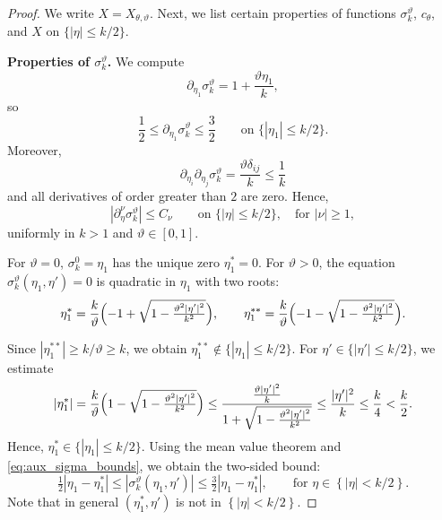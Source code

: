 \documentclass[12pt,a4paper]{amsart}
\numberwithin{equation}{section}
\theoremstyle{plain}
\theoremstyle{definition}
\begin{document}
\begin{proof}
We write $X=X_{\theta,\vartheta}$. Next, we list certain properties of functions $\sigma_k^\vartheta$, $c_\theta$, and $X$ on $\{|\eta|\leq k/2\}$.


\textbf{Properties of $\sigma_k^\vartheta$.}
We compute
\begin{equation*}
    \partial_{\eta_1}\sigma_k^\vartheta = 1+ \frac{\vartheta\eta_1}{k},
\end{equation*}
so
\begin{equation}\label{eq:aux_sigma_bounds}
  \frac{1}{2}\leq \partial_{\eta_1}\sigma_k^\vartheta\le\frac{3}{2}
  \qquad
  \text{on }\{|\eta_1|\leq k/2\}.
\end{equation}
Moreover,
\begin{equation*}
    \partial_{\eta_i}\partial_{\eta_j}\sigma_k^\vartheta = \frac{\vartheta\delta_{ij}}{k} \leq \frac{1}{k}
\end{equation*}
and all derivatives of order greater than $2$ are zero. Hence,
\begin{equation}\label{eq:aux_sigma_allderivs}
  |\partial_\eta^\nu\sigma_k^\vartheta|\leq C_\nu
  \qquad\text{on }\{|\eta|\leq k/2\},\quad\text{for }|\nu|\geq 1,
\end{equation}
uniformly in $k> 1$ and $\vartheta\in[0,1]$.

For $\vartheta=0$, $\sigma_k^0=\eta_1$ has the unique zero $\eta_1^*=0$.
For $\vartheta>0$, the equation $\sigma_k^\vartheta(\eta_1,\eta')=0$
is quadratic in $\eta_1$ with two roots:
\begin{equation*}
    \eta_1^*=\frac{k}{\vartheta}\Bigl(-1+\sqrt{1-\tfrac{\vartheta^2|\eta'|^2}{k^2}}\Bigr),
  \qquad
  \eta_1^{**}=\frac{k}{\vartheta}\Bigl(-1-\sqrt{1-\tfrac{\vartheta^2|\eta'|^2}{k^2}}\Bigr).
\end{equation*}

Since $|\eta_1^{**}|\geq k/\vartheta\geq k$, we obtain $\eta_1^{**} \notin \{|\eta_1|\leq k/2\}$. For $\eta' \in \{|\eta'|\leq k/2\}$, we estimate
\begin{equation}\label{eq:aux_eta1star}
    |\eta_1^*|=\frac{k}{\vartheta}\Bigl(1-\sqrt{1-\tfrac{\vartheta^2|\eta'|^2}{k^2}}\Bigr) \leq \frac{\frac{\vartheta|\eta'|^2}{k}}{1+\sqrt{1-\tfrac{\vartheta^2|\eta'|^2}{k^2}}} \leq \frac{|\eta'|^2}{k} \leq \frac{k}{4} < \frac{k}{2}.
\end{equation}
Hence, $\eta_1^* \in \{|\eta_1|\leq k/2\}$. Using the mean value theorem and \eqref{eq:aux_sigma_bounds}, we obtain the two-sided bound:
\begin{equation}\label{eq:aux_sigma_two_sided}
  \tfrac{1}{2}|\eta_1-\eta_1^*|
  \le|\sigma_k^\vartheta(\eta_1,\eta')|
  \le\tfrac{3}{2}|\eta_1-\eta_1^*|,
  \qquad
  \text{for } \eta \in \left\{|\eta|<k/2\right\}.
\end{equation}
Note that in general $(\eta_1^*,\eta')$ is not in $\left\{|\eta|<k/2\right\}$.


\end{proof}
\end{document}

